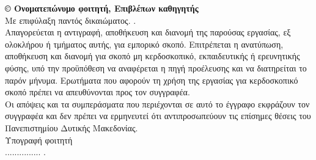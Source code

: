 \clearpage
\thispagestyle{empty}


{\normalsize \textbf{ © \the\year{} Ονοματεπώνυμο φοιτητή, Επιβλέπων καθηγητής}}\\
Με επιφύλαξη παντός δικαιώματος. .\\
\newline
Απαγορεύεται η αντιγραφή, αποθήκευση και διανομή της παρούσας εργασίας, εξ
ολοκλήρου ή τμήματος αυτής, για εμπορικό σκοπό. Επιτρέπεται η ανατύπωση,
αποθήκευση και διανομή για σκοπό μη κερδοσκοπικό, εκπαιδευτικής ή ερευνητικής
φύσης, υπό την προϋπόθεση να αναφέρεται η πηγή προέλευσης και να διατηρείται το
παρόν μήνυμα. Ερωτήματα που αφορούν τη χρήση της εργασίας για κερδοσκοπικό
σκοπό πρέπει να απευθύνονται προς τον συγγραφέα.\\
\newline
Οι απόψεις και τα συμπεράσματα που περιέχονται σε αυτό το έγγραφο εκφράζουν
τον συγγραφέα και δεν πρέπει να ερμηνευτεί ότι αντιπροσωπεύουν τις επίσημες
θέσεις του Πανεπιστημίου Δυτικής Μακεδονίας.\\


Υπογραφή φοιτητή\\ 

............... .

